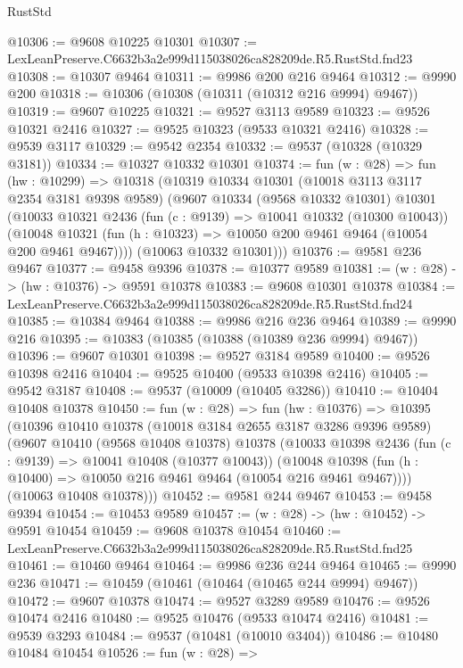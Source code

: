 \begin{lexlean}{RustStd}
\begin{coremodule}
@10306 := @9608 @10225 @10301
@10307 := LexLeanPreserve.C6632b3a2e999d115038026ca828209de.R5.RustStd.fnd23
@10308 := @10307 @9464
@10311 := @9986 @200 @216 @9464
@10312 := @9990 @200
@10318 := @10306 (@10308 (@10311 (@10312 @216 @9994) @9467))
@10319 := @9607 @10225
@10321 := @9527 @3113 @9589
@10323 := @9526 @10321 @2416
@10327 := @9525 @10323 (@9533 @10321 @2416)
@10328 := @9539 @3117
@10329 := @9542 @2354
@10332 := @9537 (@10328 (@10329 @3181))
@10334 := @10327 @10332 @10301
@10374 := fun (w : @28) =>
  fun (hw : @10299) =>
  @10318
    (@10319
      @10334
      @10301
      (@10018 @3113 @3117 @2354 @3181 @9398 @9589)
      (@9607
        @10334
        (@9568 @10332 @10301)
        @10301
        (@10033
          @10321
          @2436
          (fun (c : @9139) => @10041 @10332 (@10300 @10043))
          (@10048 @10321 (fun (h : @10323) => @10050 @200 @9461 @9464 (@10054 @200 @9461 @9467))))
        (@10063 @10332 @10301)))
@10376 := @9581 @236 @9467
@10377 := @9458 @9396
@10378 := @10377 @9589
@10381 := (w : @28) -> (hw : @10376) -> @9591 @10378
@10383 := @9608 @10301 @10378
@10384 := LexLeanPreserve.C6632b3a2e999d115038026ca828209de.R5.RustStd.fnd24
@10385 := @10384 @9464
@10388 := @9986 @216 @236 @9464
@10389 := @9990 @216
@10395 := @10383 (@10385 (@10388 (@10389 @236 @9994) @9467))
@10396 := @9607 @10301
@10398 := @9527 @3184 @9589
@10400 := @9526 @10398 @2416
@10404 := @9525 @10400 (@9533 @10398 @2416)
@10405 := @9542 @3187
@10408 := @9537 (@10009 (@10405 @3286))
@10410 := @10404 @10408 @10378
@10450 := fun (w : @28) =>
  fun (hw : @10376) =>
  @10395
    (@10396
      @10410
      @10378
      (@10018 @3184 @2655 @3187 @3286 @9396 @9589)
      (@9607
        @10410
        (@9568 @10408 @10378)
        @10378
        (@10033
          @10398
          @2436
          (fun (c : @9139) => @10041 @10408 (@10377 @10043))
          (@10048 @10398 (fun (h : @10400) => @10050 @216 @9461 @9464 (@10054 @216 @9461 @9467))))
        (@10063 @10408 @10378)))
@10452 := @9581 @244 @9467
@10453 := @9458 @9394
@10454 := @10453 @9589
@10457 := (w : @28) -> (hw : @10452) -> @9591 @10454
@10459 := @9608 @10378 @10454
@10460 := LexLeanPreserve.C6632b3a2e999d115038026ca828209de.R5.RustStd.fnd25
@10461 := @10460 @9464
@10464 := @9986 @236 @244 @9464
@10465 := @9990 @236
@10471 := @10459 (@10461 (@10464 (@10465 @244 @9994) @9467))
@10472 := @9607 @10378
@10474 := @9527 @3289 @9589
@10476 := @9526 @10474 @2416
@10480 := @9525 @10476 (@9533 @10474 @2416)
@10481 := @9539 @3293
@10484 := @9537 (@10481 (@10010 @3404))
@10486 := @10480 @10484 @10454
@10526 := fun (w : @28) =>

\end{coremodule}
\end{lexlean}
